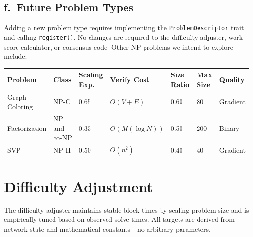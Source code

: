 \documentclass[12pt,letterpaper]{article}
\begin{document}
\subsection*{f.\ Future Problem Types}

Adding a new problem type requires implementing the \texttt{ProblemDescriptor} trait and calling
\texttt{register()}. No changes are required to the difficulty adjuster, work score calculator, or
consensus code. Other NP problems we intend to explore include:

\begin{center}
\begin{tabular}{L{2.2cm}C{1.1cm}C{1.4cm}C{1.6cm}C{1.4cm}C{1.4cm}C{1.4cm}}
\toprule
Problem & Class & Scaling Exp. & Verify Cost & Size Ratio & Max Size & Quality \\
\midrule
Graph Coloring & NP-C & 0.65 & $O(V{+}E)$ & 0.60 & 80  & Gradient \\
Factorization  & NP and co-NP & 0.33 & $O(M(\log N))$ & 0.50 & 200 & Binary   \\
SVP            & NP-H & 0.50 & $O(n^2)$     & 0.40 & 40  & Gradient \\
\bottomrule
\end{tabular}
\end{center}

\section{Difficulty Adjustment}

The difficulty adjuster maintains stable block times by scaling problem size and is empirically tuned
based on observed solve times. All targets are derived from network state and mathematical
constants---no arbitrary parameters.
\end{document}
